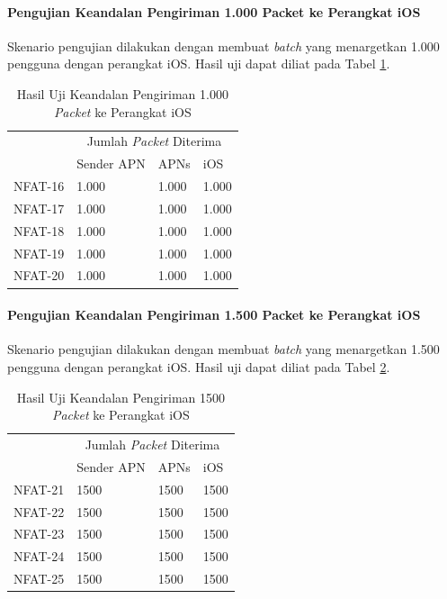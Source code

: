 \paragraph{Pengujian Keandalan Pengiriman 1.000 Packet ke Perangkat iOS}
\par Skenario pengujian dilakukan dengan membuat \textit{batch} yang menargetkan 1.000 pengguna dengan perangkat iOS. Hasil uji dapat diliat pada Tabel \ref{t:keandalan-ios-1k}.
\begin{longtable}{|p{1.5cm}|p{2cm}|p{2cm}|p{2cm}|}
	\caption{Hasil Uji Keandalan Pengiriman 1.000 \textit{Packet} ke Perangkat iOS} \label{t:keandalan-ios-1k} \\ \hline
	\rowcolor{lightgray} & \multicolumn{3}{c|}{Jumlah \textit{Packet} Diterima} \\ \hhline{~|*3{-}|}
	\rowcolor{lightgray} \multirow{-2}{*}{Kode} & Sender APN & APNs & iOS \\ \hline
	\endhead
	NFAT-16 & 1.000 & 1.000 & 1.000 \\ \hline
	NFAT-17 & 1.000 & 1.000 & 1.000 \\ \hline
	NFAT-18 & 1.000 & 1.000 & 1.000 \\ \hline
	NFAT-19 & 1.000 & 1.000 & 1.000 \\ \hline
	NFAT-20 & 1.000 & 1.000 & 1.000 \\ \hline
\end{longtable}

\paragraph{Pengujian Keandalan Pengiriman 1.500 Packet ke Perangkat iOS}
\par Skenario pengujian dilakukan dengan membuat \textit{batch} yang menargetkan 1.500 pengguna dengan perangkat iOS. Hasil uji dapat diliat pada Tabel \ref{t:keandalan-ios-1500}.
\begin{longtable}{|p{1.5cm}|p{2cm}|p{2cm}|p{2cm}|}
	\caption{Hasil Uji Keandalan Pengiriman 1500 \textit{Packet} ke Perangkat iOS} \label{t:keandalan-ios-1500} \\ \hline
	\rowcolor{lightgray} & \multicolumn{3}{c|}{Jumlah \textit{Packet} Diterima} \\ \hhline{~|*3{-}|}
	\rowcolor{lightgray} \multirow{-2}{*}{Kode} & Sender APN & APNs & iOS \\ \hline
	\endhead
	NFAT-21 & 1500 & 1500 & 1500 \\ \hline
	NFAT-22 & 1500 & 1500 & 1500 \\ \hline
	NFAT-23 & 1500 & 1500 & 1500 \\ \hline
	NFAT-24 & 1500 & 1500 & 1500 \\ \hline
	NFAT-25 & 1500 & 1500 & 1500 \\ \hline
\end{longtable}

